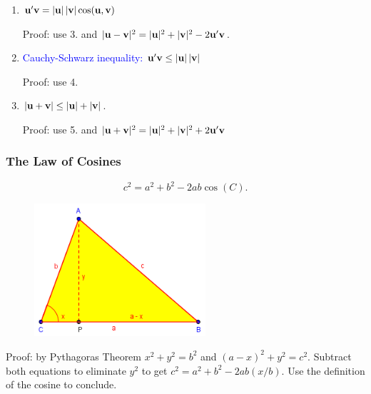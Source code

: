 \documentclass[11pt,aspectratio=169]{beamer}
\begin{document}
\begin{frame}
\begin{small}
\begin{enumerate}
\item ${\bf u}' {\bf v} = \vert {\bf u}\vert \, \vert {\bf v} \vert \cos ({\bf u}, {\bf v})$
\begin{tiny}Proof: use 3. and  $\vert {\bf u}- {\bf v}\vert^2=\vert {\bf u} \vert^2 +\vert {\bf v}\vert^2-2 {\bf u}' {\bf v}$. \end{tiny}

\item \textcolor{blue}{Cauchy-Schwarz inequality:} $ {\bf u}' {\bf v} \leq  \vert {\bf u} \vert \, \vert {\bf v} \vert$ \begin{tiny}Proof: use 4.\end{tiny}

\item $\vert {\bf u} +{\bf v}\vert\leq \vert {\bf u}\vert +\vert {\bf v}\vert$. \begin{tiny}Proof: use 5. and $\vert {\bf u}+ {\bf v}\vert^2=\vert {\bf u} \vert^2 +\vert {\bf v}\vert^2+2 {\bf u}' {\bf v}$ \end{tiny}
\end{enumerate}



\end{small}
\end{frame}


\begin{frame}
\frametitle{The Law of Cosines}
$$
c^2=a^2+b^2-2ab \cos(C).
$$
\begin{figure}
\includegraphics[width=2.5in]{img/cos} 
\end{figure}
\begin{tiny}Proof: by Pythagoras Theorem $x^2+y^2=b^2$ and $(a-x)^2+y^2=c^2$. Subtract
both equations to eliminate $y^2$ to get $c^2=a^2+b^2-2ab (x/b)$. Use the definition of the  cosine to conclude.\end{tiny}
\begin{small}
\end{small}
\end{frame}
\end{document}
